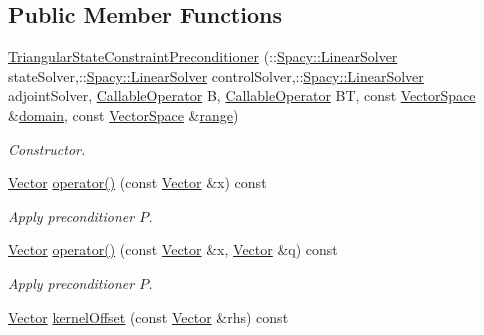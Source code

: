 \subsection*{Public Member Functions}
\begin{DoxyCompactItemize}
\item 
\hyperlink{classSpacy_1_1CG_1_1TriangularStateConstraintPreconditioner_a8bbfa8bf7bdfcd3c308d4dbec8c448d0}{Triangular\-State\-Constraint\-Preconditioner} (\-::\hyperlink{namespaceSpacy_adcd0d78166a9c972b8a2e5a689fc2d03}{Spacy\-::\-Linear\-Solver} state\-Solver,\-::\hyperlink{namespaceSpacy_adcd0d78166a9c972b8a2e5a689fc2d03}{Spacy\-::\-Linear\-Solver} control\-Solver,\-::\hyperlink{namespaceSpacy_adcd0d78166a9c972b8a2e5a689fc2d03}{Spacy\-::\-Linear\-Solver} adjoint\-Solver, \hyperlink{namespaceSpacy_a022a87afa759e18781dd2aea9a80cd73}{Callable\-Operator} B, \hyperlink{namespaceSpacy_a022a87afa759e18781dd2aea9a80cd73}{Callable\-Operator} B\-T, const \hyperlink{classSpacy_1_1VectorSpace}{Vector\-Space} \&\hyperlink{classSpacy_1_1OperatorBase_a2588f9b3e0188820c4c494e63293dc6f}{domain}, const \hyperlink{classSpacy_1_1VectorSpace}{Vector\-Space} \&\hyperlink{classSpacy_1_1OperatorBase_ab19d3b7a6f290b1079248f1e567e53d6}{range})
\begin{DoxyCompactList}\small\item\em Constructor. \end{DoxyCompactList}\item 
\hyperlink{classSpacy_1_1Vector}{Vector} \hyperlink{classSpacy_1_1CG_1_1TriangularStateConstraintPreconditioner_acf6c7985d679599274592917fdae5cbc}{operator()} (const \hyperlink{classSpacy_1_1Vector}{Vector} \&x) const 
\begin{DoxyCompactList}\small\item\em Apply preconditioner $P$. \end{DoxyCompactList}\item 
\hyperlink{classSpacy_1_1Vector}{Vector} \hyperlink{classSpacy_1_1CG_1_1TriangularStateConstraintPreconditioner_aa9baf40f360b9544b50904dc93371c3c}{operator()} (const \hyperlink{classSpacy_1_1Vector}{Vector} \&x, \hyperlink{classSpacy_1_1Vector}{Vector} \&q) const 
\begin{DoxyCompactList}\small\item\em Apply preconditioner $P$. \end{DoxyCompactList}\item 
\hyperlink{classSpacy_1_1Vector}{Vector} \hyperlink{classSpacy_1_1CG_1_1TriangularStateConstraintPreconditioner_a959f6f366b868163b6cbeda7c96bcc8e}{kernel\-Offset} (const \hyperlink{classSpacy_1_1Vector}{Vector} \&rhs) const 

\end{DoxyCompactItemize}
